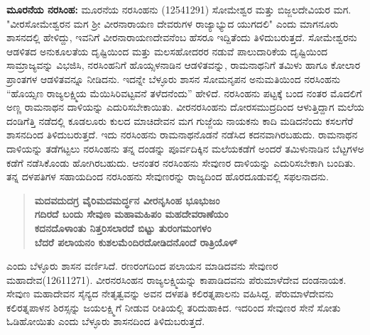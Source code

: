 \textbf{ ಮೂರನೆಯ ನರಸಿಂಹ: } ಮೂರನೆಯ ನರಸಿಂಹನು (12541291) ಸೋಮೇಶ್ವರ ಮತ್ತು ಬಿಜ್ಜಲದೇವಿಯರ ಮಗ. "ವೀರಸೋಮೇಶ್ವರನ ಮಗ ಶ‍್ರೀ ವೀರನಾರಾಯಣ ದೇವರುಗಳ ರಾಜ್ಯಾಭ್ಯುದ ಯುಗದಲಿ" ಎಂದು ಮಾಗನೂರು ಶಾಸನದಲ್ಲಿ ಹೇಳಿದ್ದು, ಇವನಿಗೆ ವೀರನಾರಾಯಣದೇವನೆಂಬ ಹೆಸರೂ ಇದ್ದಿತೆಂದು ತಿಳಿದುಬರುತ್ತದೆ. ಸೋಮೇಶ್ವರನು ಆಡಳಿತದ ಅನುಕೂಲತೆಯ ದೃಷ್ಟಿಯಿಂದ ಮತ್ತು ಮಲಸಹೋದರರ ನಡುವೆ ಪಾಲುದಾರಿಕೆಯ ದೃಷ್ಟಿಯಿಂದ ಸಾಮ್ರಾಜ್ಯವನ್ನು ವಿಭಜಿಸಿ, ನರಸಿಂಹನಿಗೆ ಹೊಯ್ಸಳನಾಡಿನ ಆಡಳಿತವನ್ನು, ರಾಮನಾಥನಿಗೆ ತಮಿಳು ಹಾಗೂ ಕೋಲಾರ ಪ್ರಾಂತಗಳ ಆಡಳಿತವನ್ನೂ ನೀಡಿದನು. ಇದನ್ನೇ ಬೆಳ್ಳೂರು ಶಾಸನ ಸೋಮನೃಪನ ಅನುಮತಿಯಿಂದ ನರಸಿಂಹನು “ಹೊಯ್ಸಣ ರಾಜ್ಯಲಕ್ಷ್ಮಿಯ ಮೆಯಿಸಿರಿವಟ್ಟವನೆ ತಳೆದನೆಂದು” ಹೇಳಿದೆ. ನರಸಿಂಹನು ಪಟ್ಟಕ್ಕೆ ಬಂದ ನಂತರ ಮೊದಲಿಗೆ ಅಣ್ಣ ರಾಮನಾಥನ ದಾಳಿಯನ್ನು ಎದುರಿಸಬೇಕಾಯಿತು. ವೀರನರಸಿಂಹನು ದೋರಸಮುದ್ರದಿಂದ ಆಳುತ್ತಿದ್ದಾಗ ಮಲೆಯ ದಂಡಿಗೆತ್ತಿ ನಡೆದಲ್ಲಿ ಕೂಡಲೂರು ಕುಲದ ಮಾಚಿದೇವನ ಮಗ ಗುಜ್ಜೆಯ ನಾಯಕನು ಕಾದಿ ಮಡಿದನೆಂದು ಕಸಲಗೆರೆ ಶಾಸನದಿಂದ ತಿಳಿದುಬರುತ್ತದೆ. ಇದು ನರಸಿಂಹನು ರಾಮನಾಥನೊಡನೆ ನಡೆಸಿದ ಕದನವಾಗಿರಬಹುದು. ರಾಮನಾಥನ ದಾಳಿಯನ್ನು ತಡೆಗಟ್ಟಲು ನರಸಿಂಹನು ತನ್ನ ದಂಡನ್ನು ಪೂರ್ವದಿಕ್ಕಿನ ಮಲೆಯಕಡೆಗೆ ಅಂದರೆ ತಮಿಳುನಾಡಿನ ಬೆಟ್ಟಗಳಅ ಕಡೆಗೆ ನಡೆಸಿಕೊಂಡು ಹೋಗಿರಬಹುದು. ಆನಂತರ ನರಸಿಂಹನು ಸೇವುಣರ ದಾಳಿಯನ್ನು ಎದುರಿಸಬೇಕಾಗಿ ಬಂದಿತು. ತನ್ನ ದಳಪತಿಗಳ ಸಹಾಯದಿಂದ ನರಸಿಂಹನು ಸೇವುಣರನ್ನು ರಾಜ್ಯದಿಂದ ಹೊರದೂಡುವಲ್ಲಿ ಸಫಲನಾದನು.

\begin{verse}
\textbf{ಮದವದುದಗ್ರ ವೈರಿಮದಮರ್ದ್ಧನ ವೀರನೃಸಿಂಹ ಭೂಭುಜಂ} \\\textbf{ಗದಿರದೆ ಬಂದು ಸೇವುಣ ಮಹಾಮಹಿಪಂ ಮಹದೇವರಾಣೆಯಂ} \\\textbf{ಕದನದೊಳಾಂತು ನಿತ್ತರಿಸಲಾರದೆ ಬಿಟ್ಟು ತುರಂಗಮಂಗಳಂ} \\\textbf{ಬೆದರೆ ಪಲಾಯನಂ ಕುಶಲಮೆಂದಿರದೋಡಿದನೊಂದೆ ರಾತ್ರಿಯೊಳ್​}
\end{verse}

\newpage

ಎಂದು ಬೆಳ್ಳೂರು ಶಾಸನ ವರ್ಣಿಸಿದೆ. ರಣರಂಗದಿಂದ ಪಲಾಯನ ಮಾಡಿದವನು ಸೇವುಣರ ಮಹಾದೇವ(12611271). ವೀರನರಸಿಂಹನ ರಾಜ್ಯಲಕ್ಷ್ಮಿಯನ್ನು ಕಾಪಾಡಿದವನು ಪೆರುಮಾಳೆದೇವ ದಂಡನಾಯಕ. ಸೇವುಣ ಮಹಾದೇವನ ಸೈನ್ಯದ ನೇತೃತ್ವವನ್ನು ಅವನ ದಳಪತಿ ಕಲಿರತ್ನಪಾಲನು ವಹಿಸಿದ್ದ. ಪೆರುಮಾಳೆದೇವನು ಕಲಿರತ್ನಪಾಳನ ಶಿರಸ್ಸನ್ನು ಜಯಲಕ್ಷ್ಮಿಗೆ ನೀಡುವ ರೀತಿಯಲ್ಲಿ ತರಿದುಹಾಕಿದ. ಇದರಿಂದ ಸೇವುಣರ ಸೇನೆ ಸೋತು ಓಡಿಹೋಯಿತು ಎಂದು ಬೆಳ್ಳೂರು ಶಾಸನದಿಂದ ತಿಳಿದುಬರುತ್ತದೆ.

